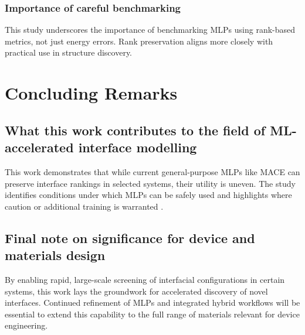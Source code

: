 
\subsubsection{Importance of careful benchmarking}

This study underscores the importance of benchmarking MLPs using rank-based metrics, not just energy errors. Rank preservation aligns more closely with practical use in structure discovery.

\section{Concluding Remarks} \label{section:concluding_remarks}

\subsection{What this work contributes to the field of ML-accelerated interface modelling}

This work demonstrates that while current general-purpose MLPs like MACE can preserve interface rankings in selected systems, their utility is uneven. The study identifies conditions under which MLPs can be safely used and highlights where caution or additional training is warranted .

\subsection{Final note on significance for device and materials design}

By enabling rapid, large-scale screening of interfacial configurations in certain systems, this work lays the groundwork for accelerated discovery of novel interfaces. Continued refinement of MLPs and integrated hybrid workflows will be essential to extend this capability to the full range of materials relevant for device engineering. 

